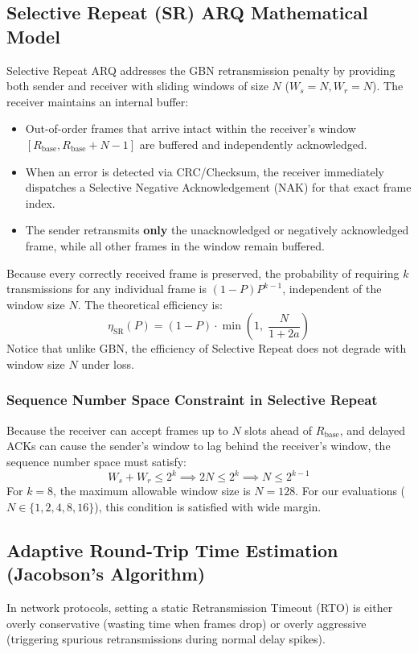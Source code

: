 \documentclass[11pt,a4paper]{article}
\begin{document}
\subsection{Selective Repeat (SR) ARQ Mathematical Model}
Selective Repeat ARQ addresses the GBN retransmission penalty by providing both sender and receiver with sliding windows of size $N$ ($W_s = N, W_r = N$). The receiver maintains an internal buffer:
\begin{itemize}
    \item Out-of-order frames that arrive intact within the receiver's window $[R_{\text{base}}, R_{\text{base}} + N - 1]$ are buffered and independently acknowledged.
    \item When an error is detected via CRC/Checksum, the receiver immediately dispatches a Selective Negative Acknowledgement (NAK) for that exact frame index.
    \item The sender retransmits \textbf{only} the unacknowledged or negatively acknowledged frame, while all other frames in the window remain buffered.
\end{itemize}
Because every correctly received frame is preserved, the probability of requiring $k$ transmissions for any individual frame is $(1 - P) P^{k-1}$, independent of the window size $N$. The theoretical efficiency is:
\begin{equation}
    \eta_{\text{SR}}(P) = (1 - P) \cdot \min\left(1, \; \frac{N}{1 + 2a}\right)
\end{equation}
Notice that unlike GBN, the efficiency of Selective Repeat does not degrade with window size $N$ under loss.

\subsubsection{Sequence Number Space Constraint in Selective Repeat}
Because the receiver can accept frames up to $N$ slots ahead of $R_{\text{base}}$, and delayed ACKs can cause the sender's window to lag behind the receiver's window, the sequence number space must satisfy:
\begin{equation}
    W_s + W_r \le 2^k \implies 2N \le 2^k \implies N \le 2^{k-1}
\end{equation}
For $k = 8$, the maximum allowable window size is $N = 128$. For our evaluations ($N \in \{1, 2, 4, 8, 16\}$), this condition is satisfied with wide margin.

\subsection{Adaptive Round-Trip Time Estimation (Jacobson's Algorithm)}
In network protocols, setting a static Retransmission Timeout (RTO) is either overly conservative (wasting time when frames drop) or overly aggressive (triggering spurious retransmissions during normal delay spikes). 
\end{document}
